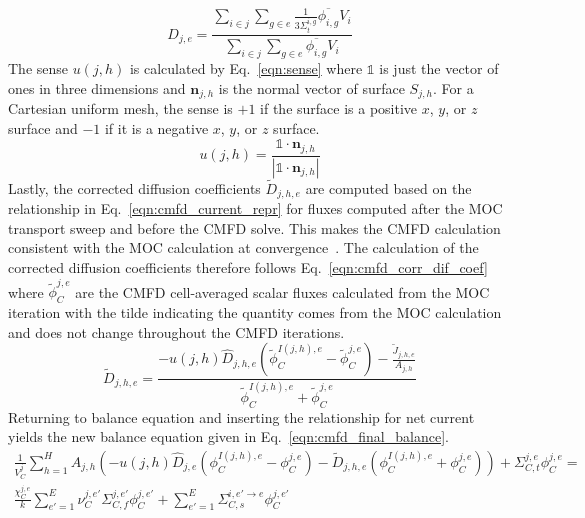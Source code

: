 \begin{equation}
	D_{j,e} = \frac{\sum_{i \in j} \sum_{g \in e} \frac{1}{3\Sigma_{t}^{i, g}} \overline{\phi_{i,g}} V_i}{\sum_{i \in j} \sum_{g \in e} \overline{\phi_{i,g}} V_i}
	\label{eqn:cmfd_diff_coef}
\end{equation}
The sense $u(j,h)$ is calculated by Eq.~\ref{eqn:sense} where $\mathbb{1}$ is just the vector of ones in three dimensions and $\mathbf{n}_{j,h}$ is the normal vector of surface $S_{j,h}$. For a Cartesian uniform mesh, the sense is $+1$ if the surface is a positive $x$, $y$, or $z$ surface and $-1$ if it is a negative $x$, $y$, or $z$ surface.
\begin{equation}
u(j,h) = \frac{\mathbb{1} \cdot \mathbf{n}_{j,h}}{|\mathbb{1} \cdot \mathbf{n}_{j,h}|}
\label{eqn:sense}
\end{equation}
Lastly, the corrected diffusion coefficients $\tilde{D}_{j,h,e}$ are computed based on the relationship in Eq.~\ref{eqn:cmfd_current_repr} for fluxes computed after the MOC transport sweep and before the CMFD solve. This makes the CMFD calculation consistent with the MOC calculation at convergence~\cite{smith1983cmfd}. The calculation of the corrected diffusion coefficients therefore follows Eq.~\ref{eqn:cmfd_corr_dif_coef} where $\tilde{\phi}_C^{j,e}$ are the CMFD cell-averaged scalar fluxes calculated from the MOC iteration with the tilde indicating the quantity comes from the MOC calculation and does not change throughout the CMFD iterations.
\begin{equation}
	\tilde{D}_{j,h,e} = \frac{-u(j, h) \hat{D}_{j,h,e} \left(\tilde{\phi}_C^{I(j,h),e} - \tilde{\phi}_C^{j,e}\right) - \frac{\tilde{J}_{j,h,e}}{A_{j,h}}}{\tilde{\phi}_C^{I(j,h),e} + \tilde{\phi}_C^{j,e}}
	\label{eqn:cmfd_corr_dif_coef}
\end{equation}
Returning to balance equation and inserting the relationship for net current yields the new balance equation given in Eq.~\ref{eqn:cmfd_final_balance}.
\begin{equation}
\begin{split}
	\frac{1}{V_C^j} \sum_{h=1}^H A_{j,h} \left( - u(j, h) \hat{D}_{j,e} \left(\phi_C^{I(j,h),e} - \phi_C^{j,e}\right) - \tilde{D}_{j,h,e} \left(\phi_C^{I(j,h),e} + \phi_C^{j,e}\right) \right) + \Sigma_{C,t}^{j,e} \phi_C^{j,e} = \\
	\frac{\chi_C^{j,e}}{k} \sum_{e'=1}^{E} \nu_C^{j, e'} \Sigma_{C,f}^{j,e'} \phi_C^{j,e'} + \sum_{e'=1}^E  \Sigma_{C,s}^{i, e' \rightarrow e} \phi_C^{j,e'}
\end{split}
\label{eqn:cmfd_final_balance}
\end{equation}

